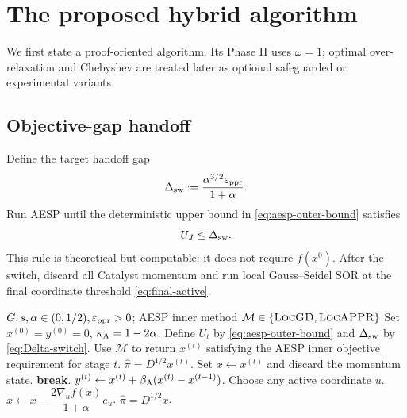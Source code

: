 \section{The proposed hybrid algorithm}
\label{sec:algorithm}

We first state a proof-oriented algorithm.  Its Phase II uses $\omega=1$;
optimal over-relaxation and Chebyshev are treated later as optional safeguarded
or experimental variants.

\subsection{Objective-gap handoff}

Define the target handoff gap
\begin{equation}
  \Delta_{\rm sw}
  :=\frac{\alpha^{3/2}\varepsilon_{\mathrm{ppr}}}{1+\alpha}.
  \label{eq:Delta-switch}
\end{equation}
Run AESP until the deterministic upper bound in
\cref{eq:aesp-outer-bound} satisfies
\begin{equation}
  U_J\leq\Delta_{\rm sw}.
  \label{eq:objective-switch}
\end{equation}
This rule is theoretical but computable: it does not require $f(x^0)$.
After the switch, discard all Catalyst momentum and run local Gauss--Seidel
SOR at the final coordinate threshold \cref{eq:final-active}.

\begin{algorithm}[t]
\caption{Proof-oriented AESP--LOCSOR hybrid}
\label{alg:hybrid}
\begin{algorithmic}[1]
\REQUIRE $G,s,\alpha\in(0,1/2),\varepsilon_{\mathrm{ppr}}>0$; AESP inner method
         $\mathcal M\in\{\textsc{LocGD},\textsc{LocAPPR}\}$
\STATE Set $x^{(0)}=y^{(0)}=0$, $\kappa_{\rm A}=1-2\alpha$.
\STATE Define $U_t$ by \cref{eq:aesp-outer-bound} and
       $\Delta_{\rm sw}$ by \cref{eq:Delta-switch}.
  \STATE Use $\mathcal M$ to return $x^{(t)}$ satisfying the AESP
         inner objective requirement for stage $t$.
    \RETURN $\widehat\pi=D^{1/2}x^{(t)}$.
  \ENDIF
    \STATE Set $x\leftarrow x^{(t)}$ and discard the momentum state.
    \STATE \textbf{break}.
  \ENDIF
  \STATE $y^{(t)}\leftarrow x^{(t)}+
    \beta_{\rm A}(x^{(t)}-x^{(t-1)})$.
\ENDFOR
{}
  \STATE Choose any active coordinate $u$.
  \STATE $x\leftarrow x-\dfrac{2\nabla_u f(x)}{1+\alpha}e_u$.
\ENDWHILE
\RETURN $\widehat\pi=D^{1/2}x$.
\end{algorithmic}
\end{algorithm}

